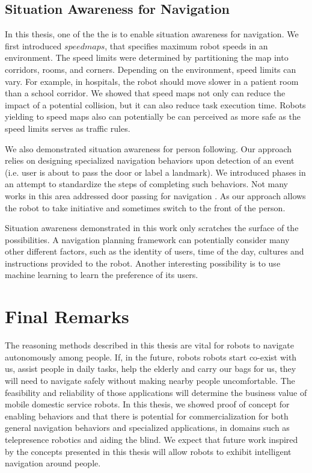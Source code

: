 \subsection{Situation Awareness for Navigation}

In this thesis, one of the the is to enable situation awareness for navigation. We first introduced $speed maps$, that specifies maximum robot speeds in an environment. The speed limits were determined by partitioning the map into corridors, rooms, and corners. Depending on the environment, speed limits can vary. For example, in hospitals, the robot should move slower in a patient room than a school corridor. We showed that speed maps not only can reduce the impact of a potential collision, but it can also reduce task execution time. Robots yielding to speed maps also can potentially be can perceived as more safe as the speed limits serves as traffic rules.

We also demonstrated situation awareness for person following. Our approach relies on designing specialized navigation behaviors upon detection of an event (i.e. user is about to pass the door or label a landmark). We introduced phases in an attempt to standardize the steps of completing such behaviors. Not many works in this area addressed door passing for navigation \cite{zender2007integrated}. As our approach allows the robot to take initiative and sometimes switch to the front of the person.

Situation awareness demonstrated in this work only scratches the surface of the possibilities. A navigation planning framework can potentially consider many other different factors, such as the identity of users, time of the day, cultures and instructions provided to the robot. Another interesting possibility is to use machine learning to learn the preference of its users.


\section{Final Remarks}

The reasoning methods described in this thesis are vital for robots to navigate autonomously among people. If, in the future, robots robots start co-exist with us, assist people in daily tasks, help the elderly and carry our bags for us, they will need to navigate safely without making nearby people uncomfortable. The feasibility and reliability of those applications will determine the business value of mobile domestic service robots. In this thesis, we showed proof of concept for enabling behaviors and that there is potential for commercialization for both general navigation behaviors and specialized applications, in domains such as telepresence robotics and aiding the blind. We expect that future work inspired by the concepts presented in this thesis will allow robots to exhibit intelligent navigation around people.